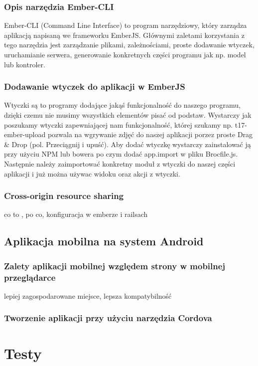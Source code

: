 \documentclass[brudnopis]{xmgr}
\begin{document}
\subsection{Opis narzędzia Ember-CLI}
Ember-CLI (Command Line Interface) to program narzędziowy, który zarządza aplikacją napisaną we frameworku EmberJS. Głównymi zaletami korzystania z tego narzędzia jest zarządzanie plikami, zależnościami, proste dodawanie wtyczek, uruchamianie serwera, generowanie konkretnych części programu jak np. model lub kontroler.

\subsection{Dodawanie wtyczek do aplikacji w EmberJS}
Wtyczki są to programy dodające jakąś funkcjonalność do naszego programu, dzięki czemu nie musimy wszystkich elementów pisać od podstaw. Wystarczy jak poszukamy wtyczki zapewniającej nam funkcjonalność, której szukamy np. t17-ember-upload pozwala na wgrywanie zdjęć do naszej aplikacji porzez proste Drag \& Drop (pol. Przeciągnij i upuść).  Aby dodać wtyczkę wystarczy zainstalować ją przy użyciu NPM lub bowera  po czym dodać app.import w pliku Brocfile.js. Następnie należy zaimportować konkretny moduł z wtyczki do naszej części aplikacji i już można używac widoku oraz akcji z wtyczki.
\subsection{Cross-origin resource sharing} co to , po co, konfiguracja w emberze i railsach
\section{Aplikacja mobilna  na system Android}

\subsection{Zalety aplikacji mobilnej względem strony w mobilnej przeglądarce}
lepiej zagospodarowane miejsce, lepsza kompatybilność 
\subsection{Tworzenie aplikacji przy użyciu narzędzia Cordova}

\chapter{Testy}
\end{document}
